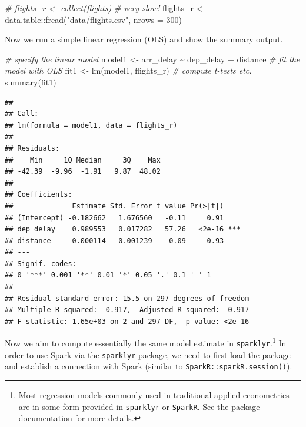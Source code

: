 \documentclass[
  12pt,
]{style/krantz}
\newenvironment{Shaded}{\begin{snugshade}}{\end{snugshade}}
\newcommand{\AttributeTok}[1]{\textcolor[rgb]{0.77,0.63,0.00}{#1}}
\newcommand{\CommentTok}[1]{\textcolor[rgb]{0.56,0.35,0.01}{\textit{#1}}}
\newcommand{\DecValTok}[1]{\textcolor[rgb]{0.00,0.00,0.81}{#1}}
\newcommand{\FunctionTok}[1]{\textcolor[rgb]{0.00,0.00,0.00}{#1}}
\newcommand{\NormalTok}[1]{#1}
\newcommand{\OtherTok}[1]{\textcolor[rgb]{0.56,0.35,0.01}{#1}}
\newcommand{\SpecialCharTok}[1]{\textcolor[rgb]{0.00,0.00,0.00}{#1}}
\newcommand{\StringTok}[1]{\textcolor[rgb]{0.31,0.60,0.02}{#1}}
\begin{document}
\begin{Shaded}
\begin{Highlighting}[]
\CommentTok{\# flights\_r \textless{}{-} collect(flights) \# very slow!}
\NormalTok{flights\_r }\OtherTok{\textless{}{-}}\NormalTok{ data.table}\SpecialCharTok{::}\FunctionTok{fread}\NormalTok{(}\StringTok{"data/flights.csv"}\NormalTok{, }\AttributeTok{nrows =} \DecValTok{300}\NormalTok{) }
\end{Highlighting}
\end{Shaded}

Now we run a simple linear regression (OLS) and show the summary output.

\begin{Shaded}
\begin{Highlighting}[]
\CommentTok{\# specify the linear model}
\NormalTok{model1 }\OtherTok{\textless{}{-}}\NormalTok{ arr\_delay }\SpecialCharTok{\textasciitilde{}}\NormalTok{ dep\_delay }\SpecialCharTok{+}\NormalTok{ distance}
\CommentTok{\# fit the model with OLS}
\NormalTok{fit1 }\OtherTok{\textless{}{-}} \FunctionTok{lm}\NormalTok{(model1, flights\_r)}
\CommentTok{\# compute t{-}tests etc.}
\FunctionTok{summary}\NormalTok{(fit1)}
\end{Highlighting}
\end{Shaded}

\begin{verbatim}
## 
## Call:
## lm(formula = model1, data = flights_r)
## 
## Residuals:
##    Min     1Q Median     3Q    Max 
## -42.39  -9.96  -1.91   9.87  48.02 
## 
## Coefficients:
##              Estimate Std. Error t value Pr(>|t|)    
## (Intercept) -0.182662   1.676560   -0.11     0.91    
## dep_delay    0.989553   0.017282   57.26   <2e-16 ***
## distance     0.000114   0.001239    0.09     0.93    
## ---
## Signif. codes:  
## 0 '***' 0.001 '**' 0.01 '*' 0.05 '.' 0.1 ' ' 1
## 
## Residual standard error: 15.5 on 297 degrees of freedom
## Multiple R-squared:  0.917,  Adjusted R-squared:  0.917 
## F-statistic: 1.65e+03 on 2 and 297 DF,  p-value: <2e-16
\end{verbatim}

Now we aim to compute essentially the same model estimate in \texttt{sparklyr}.\footnote{Most regression models commonly used in traditional applied econometrics are in some form provided in \texttt{sparklyr} or \texttt{SparkR}. See the package documentation for more details.} In order to use Spark via the \texttt{sparklyr} package, we need to first load the package and establish a connection with Spark (similar to \texttt{SparkR::sparkR.session()}).
\end{document}

